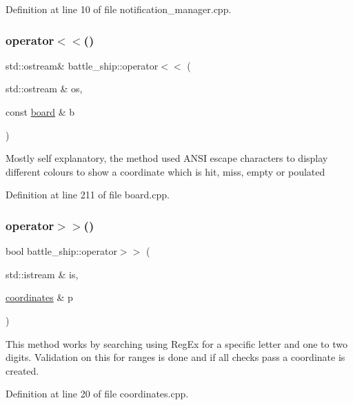 Definition at line 10 of file notification\+\_\+manager.\+cpp.

\mbox{\label{namespacebattle__ship_a8f319aebd93115655c5cfd648a988e01}} 
\subsubsection{\texorpdfstring{operator$<$$<$()}{operator<<()}\hspace{0.1cm}{\footnotesize\ttfamily [3/3]}}
{\footnotesize\ttfamily std\+::ostream\& battle\+\_\+ship\+::operator$<$$<$ (\begin{DoxyParamCaption}\item[{std\+::ostream \&}]{os,  }\item[{const \hyperlink{classbattle__ship_1_1board}{board} \&}]{b }\end{DoxyParamCaption})}

Mostly self explanatory, the method used A\+N\+SI escape characters to display different colours to show a coordinate which is hit, miss, empty or poulated 

Definition at line 211 of file board.\+cpp.

\mbox{\label{namespacebattle__ship_ab0747cf7357f5f11e76979fdf9757861}} 
\subsubsection{\texorpdfstring{operator$>$$>$()}{operator>>()}}
{\footnotesize\ttfamily bool battle\+\_\+ship\+::operator$>$$>$ (\begin{DoxyParamCaption}\item[{std\+::istream \&}]{is,  }\item[{\hyperlink{structbattle__ship_1_1coordinates}{coordinates} \&}]{p }\end{DoxyParamCaption})}

This method works by searching using Reg\+Ex for a specific letter and one to two digits. Validation on this for ranges is done and if all checks pass a coordinate is created. 

Definition at line 20 of file coordinates.\+cpp.

